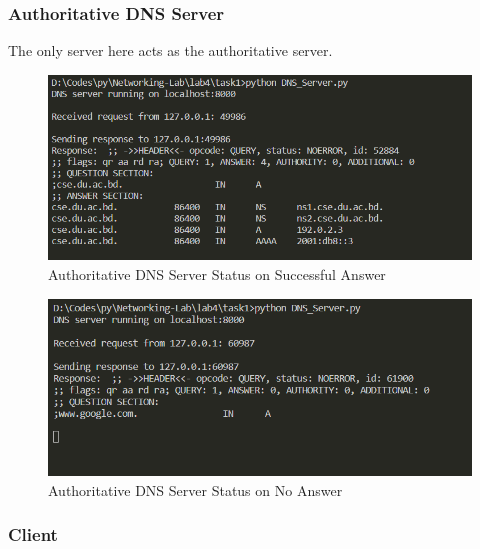 \documentclass[11pt]{article}
\begin{document}
        \subsubsection*{Authoritative DNS Server}
        The only server here acts as the authoritative server.
            \begin{figure}[!h]
                \centering
                \includegraphics*[width=\textwidth]{task1_server.png}
                \caption{Authoritative DNS Server Status on Successful Answer}
            \end{figure}

            \begin{figure}[!h]
                \centering
                \includegraphics*[width=\textwidth]{task1_server_uns.png}
                \caption{Authoritative DNS Server Status on No Answer}
            \end{figure}
        \FloatBarrier

        \subsubsection*{Client}
\end{document}
